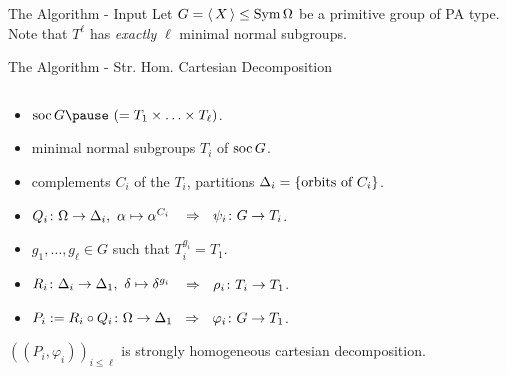 \begin{frame}{The Algorithm - Input}
    \centering
    \large
    Let $G =  \left\langle \, X \, \right\rangle  \leq \operatorname{Sym} \Omega$ be a primitive group of PA type.
    \\[1em]
    \pause
    Note that $T ^ \ell$ has \emph{exactly} $\ell$ minimal normal subgroups.
\end{frame}


\begin{frame}{The Algorithm - Str. Hom. Cartesian Decomposition}
    \begin{alg}
        $~$
        \\[-1em]
        \begin{itemize}
            \item
            $\soc G \pause ~ (= T_1 \times \ldots \times T_\ell)$.
            \pause
            \item
            minimal normal subgroups $T_i$ of $\operatorname{soc} G$.
            \pause
            \item
            complements $C_i$ of the $T_i$,
            \pause
            partitions $\Delta_i =  \left\{  \text{orbits of } C_i  \right\} $.
            \pause
            \item
            $Q_i \colon \Omega \rightarrow \Delta_i,
            ~ \alpha \mapsto \alpha ^ {C_i}$
            \pause
            $~~\Rightarrow~~ \psi_i \colon G \rightarrow T_i$.
            \pause
            \item
            $g_1, \ldots, g_\ell \in G$ such that $T_i ^ {g_i} = T_1$.
            \pause
            \item
            $R_i \colon \Delta_i \rightarrow \Delta_1,
            ~ \delta \mapsto \delta ^ {g_i}$
            \pause
            $~~\Rightarrow~~ \rho_i \colon T_i \rightarrow T_1$.
            \pause
            \item
            $P_i := R_i \circ Q_i \colon \Omega \rightarrow \Delta_1$
            \pause
            $\hspace{0.5em}\Rightarrow~~ \varphi_i \colon G \rightarrow T_1$.
        \end{itemize}
    \end{alg}
    \pause

    $((P_i, \varphi_i))_{i \leq \ell}$
    is strongly homogeneous cartesian decomposition.
\end{frame}

